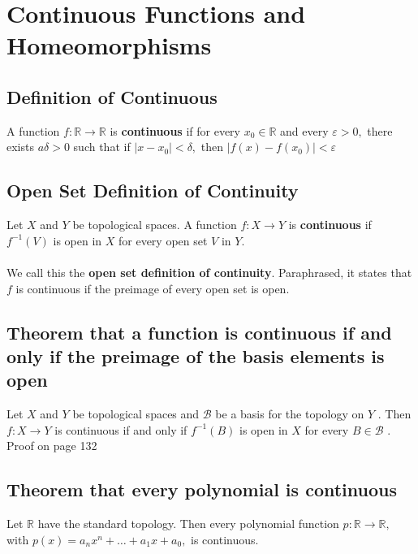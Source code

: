 \documentclass[12pt]{article}
\begin{document}
\pagestyle{fancy}  
\lfoot{} \cfoot{} \rfoot{}

\setcounter{section}{3}

\section{Continuous Functions and Homeomorphisms}
	\subsection{Definition of Continuous}
		A function $f : \mathbb { R } \rightarrow \mathbb { R }$ is \textbf{continuous} if for every $x _ { 0 } \in \mathbb { R }$ and every $\varepsilon > 0 ,$ there exists $a \delta > 0$ such that if $\left| x - x _ { 0 } \right| < \delta ,$ then $\left| f ( x ) - f \left( x _ { 0 } \right) \right| < \varepsilon$
		
	\subsection{Open Set Definition of Continuity}
		Let $X$ and $Y$ be topological spaces. A function $f : X \rightarrow Y$ is \textbf{continuous} if $f ^ { - 1 } ( V )$ is open in $X$ for every open set $V$ in $Y .$\\
		\\
		We call this the \textbf{open set definition of continuity}. Paraphrased, it states
		that $f$ is continuous if the preimage of every open set is open.
	
	\subsection{Theorem that a function is continuous if and only if the preimage of the basis elements is open}
		Let $X$ and $Y$ be topological spaces and $\mathcal { B }$ be a basis for the
		topology on $Y$ . Then $f : X \rightarrow Y$ is continuous if and only if $f ^ { - 1 } ( B )$ is open
		in $X$ for every $B \in \mathcal { B }$ .\\
		\subitem Proof on page 132
		
	\subsection{Theorem that every polynomial is continuous}
		Let $\mathbb { R }$ have the standard topology. Then every polynomial
		function $p : \mathbb { R } \rightarrow \mathbb { R } ,$ with $p ( x ) = a _ { n } x ^ { n } + \ldots + a _ { 1 } x + a _ { 0 } ,$ is continuous.
		
\end{document}

